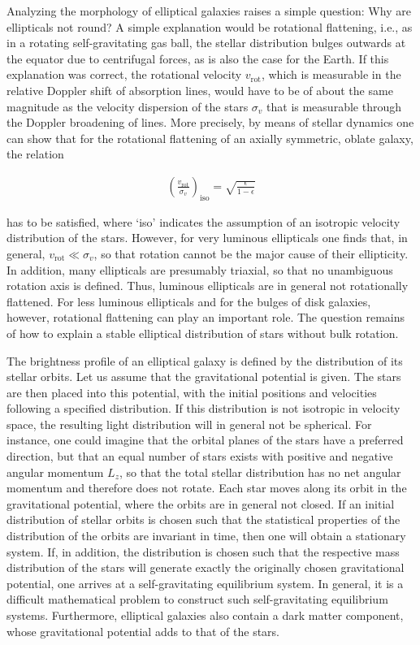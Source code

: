 \documentclass[a4paper,11pt]{article}
\begin{document}
{\noindent}Analyzing the morphology of elliptical galaxies raises a simple question: Why are ellipticals not round? A simple explanation would be rotational flattening, i.e., as in a rotating self-gravitating gas ball, the stellar distribution bulges outwards at the equator due to centrifugal forces, as is also the case for the Earth. If this explanation was correct, the rotational velocity $v_\mathrm{rot}$, which is measurable in the relative Doppler shift of absorption lines, would have to be of about the same magnitude as the velocity dispersion of the stars $\sigma_v$ that is measurable through the Doppler broadening of lines. More precisely, by means of stellar dynamics one can show that for the rotational flattening of an axially symmetric, oblate galaxy, the relation

\begin{align*}
    \left(\frac{v_\mathrm{rot}}{\sigma_v}\right)_\mathrm{iso} = \sqrt{\frac{\epsilon}{1-\epsilon}}
\end{align*}

{\noindent}has to be satisfied, where `iso' indicates the assumption of an isotropic velocity distribution of the stars. However, for very luminous ellipticals one finds that, in general, $v_\mathrm{rot}\ll \sigma_v$, so that rotation cannot be the major cause of their ellipticity. In addition, many ellipticals are presumably triaxial, so that no unambiguous rotation axis is defined. Thus, luminous ellipticals are in general not rotationally flattened. For less luminous ellipticals and for the bulges of disk galaxies, however, rotational flattening can play an important role. The question remains of how to explain a stable elliptical distribution of stars without bulk rotation.

{\noindent}The brightness profile of an elliptical galaxy is defined by the distribution of its stellar orbits. Let us assume that the gravitational potential is given. The stars are then placed into this potential, with the initial positions and velocities following a specified distribution. If this distribution is not isotropic in velocity space, the resulting light distribution will in general not be spherical. For instance, one could imagine that the orbital planes of the stars have a preferred direction, but that an equal number of stars exists with positive and negative angular momentum $L_z$, so that the total stellar distribution has no net angular momentum and therefore does not rotate. Each star moves along its orbit in the gravitational potential, where the orbits are in general not closed. If an initial distribution of stellar orbits is chosen such that the statistical properties of the distribution of the orbits are invariant in time, then one will obtain a stationary system. If, in addition, the distribution is chosen such that the respective mass distribution of the stars will generate exactly the originally chosen gravitational potential, one arrives at a self-gravitating equilibrium system. In general, it is a difficult mathematical problem to construct such self-gravitating equilibrium systems. Furthermore, elliptical galaxies also contain a dark matter component, whose gravitational potential adds to that of the stars.
\end{document}
